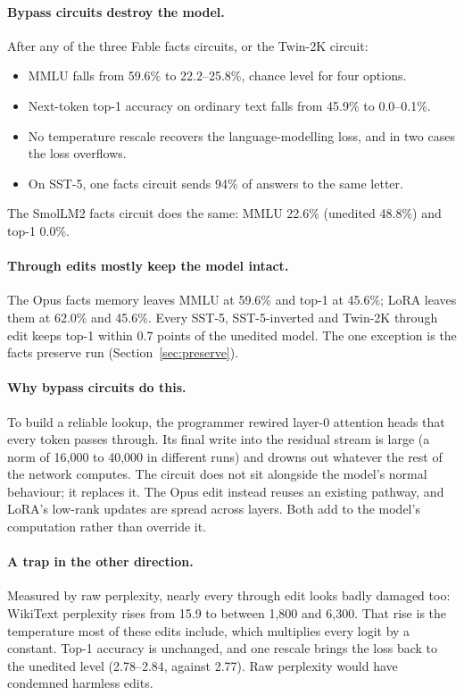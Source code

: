 \paragraph{Bypass circuits destroy the model.} After any of the three Fable facts circuits, or the Twin-2K circuit:
\begin{itemize}
  \item MMLU falls from 59.6\% to 22.2--25.8\%, chance level for four options.
  \item Next-token top-1 accuracy on ordinary text falls from 45.9\% to 0.0--0.1\%.
  \item No temperature rescale recovers the language-modelling loss, and in two cases the loss overflows.
  \item On SST-5, one facts circuit sends 94\% of answers to the same letter.
\end{itemize}
The SmolLM2 facts circuit does the same: MMLU 22.6\% (unedited 48.8\%) and top-1 0.0\%.

\paragraph{Through edits mostly keep the model intact.} The Opus facts memory leaves MMLU at 59.6\% and top-1 at 45.6\%; LoRA leaves them at 62.0\% and 45.6\%. Every SST-5, SST-5-inverted and Twin-2K through edit keeps top-1 within 0.7 points of the unedited model. The one exception is the facts preserve run (Section~\ref{sec:preserve}).

\paragraph{Why bypass circuits do this.} To build a reliable lookup, the programmer rewired layer-0 attention heads that every token passes through. Its final write into the residual stream is large (a norm of 16,000 to 40,000 in different runs) and drowns out whatever the rest of the network computes. The circuit does not sit alongside the model's normal behaviour; it replaces it. The Opus edit instead reuses an existing pathway, and LoRA's low-rank updates are spread across layers. Both add to the model's computation rather than override it.

\paragraph{A trap in the other direction.} Measured by raw perplexity, nearly every through edit looks badly damaged too: WikiText perplexity rises from 15.9 to between 1,800 and 6,300. That rise is the temperature most of these edits include, which multiplies every logit by a constant. Top-1 accuracy is unchanged, and one rescale brings the loss back to the unedited level (2.78--2.84, against 2.77). Raw perplexity would have condemned harmless edits.

